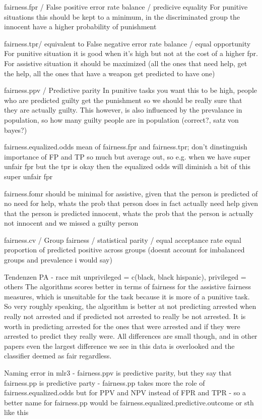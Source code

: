 \documentclass{article}
\begin{document}
fairness.fpr / False positive error rate balance / predicive equality
For punitive situations this should be kept to a minimum, in the discriminated group the innocent have a higher probability of punishment

fairness.tpr/ equivalent to False negative error rate balance / equal opportunity
For punitive situation it is good when it's high but not at the cost of a higher fpr. For assistive situation it should be maximized (all the ones that need help, get the help, all the ones that have a weapon get predicted to have one)

fairness.ppv / Predictive parity
In punitive tasks you want this to be high, people who are predicted guilty get the punishment so we should be really sure that they are actually guilty. This however, is also influenced by the prevalance in population, so how many guilty people are in population (correct?, satz von bayes?)

fairness.equalized.odds
mean of fairness.fpr and fairness.tpr; don't dinstinguish importance of FP and TP so much but average out, so e.g. when we have super unfair fpr but the tpr is okay then the equalized odds will diminish a bit of this super unfair fpr

fairness.fomr
should be minimal for assistive, given that the person is predicted of no need for help, whats the prob that person does in fact actually need help
given that the person is predicted innocent, whats the prob that the person is actually not innocent and we missed a guilty person

fairness.cv / Group fairness / statistical parity / equal acceptance rate
equal proportion of predicted positive across groups (doesnt account for imbalanced groups and prevalence i would say)


Tendenzen
PA - race mit unprivileged = c(black, black hispanic), privileged = others
The algorithms scores better in terms of fairness for the assistive fairness measures, which is unsuitable for the task because it is more of a punitive task. So very roughly speaking, the algorithm is better at not predicting arrested when really not arrested and if predicted not arrested to really be not arrested. It is worth in predicting arrested for the ones that were arrested and if they were arrested to predict they really were.
All differences are small though, and in other papers even the largest difference we see in this data is overlooked and the classifier deemed as fair regardless.


Naming error in mlr3
- fairness.ppv is predictive parity, but they say that fairness.pp is predictive party
- fairness.pp takes more the role of fairness.equalized.odds but for PPV and NPV instead of FPR and TPR
- so a better name for fairness.pp would be fairness.equalized.predictive.outcome or sth like this
\end{document}

